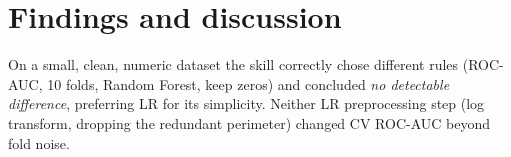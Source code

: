 \documentclass[10pt]{article}
\begin{document}
\section{Findings and discussion}
On a small, clean, numeric dataset the skill correctly chose different rules (ROC-AUC, 10 folds, Random Forest, keep zeros) and concluded \emph{no detectable difference}, preferring LR for its simplicity. Neither LR preprocessing step (log transform, dropping the redundant perimeter) changed CV ROC-AUC beyond fold noise.

\FloatBarrier
\label{endofreport}
\end{document}
